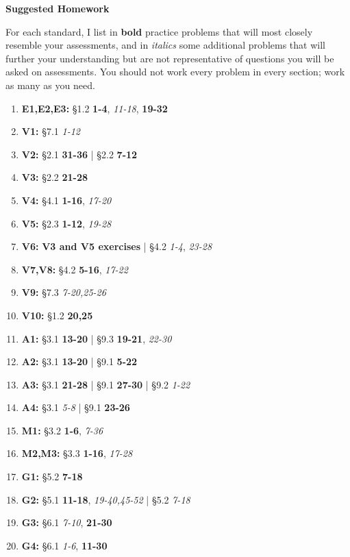 \documentclass{article}
\begin{document}
\begin{center}
\Large \textbf{Suggested Homework}
\end{center}

\newcommand{\closeExamples}{\textbf}
\newcommand{\otherExamples}{\textit}
\newcommand{\standards}[1]{\item[\textbf{#1}]}

For each standard, I list in \closeExamples{bold} practice problems that will most closely resemble your assessments, and in \otherExamples{italics} some additional problems that will further your understanding but are not representative of questions you will be asked on assessments.  You should not work every problem in every section; work as many as you need.

\begin{enumerate}
  \standards{E1,E2,E3:} \S 1.2
    \closeExamples{1-4},
    \otherExamples{11-18},
    \closeExamples{19-32}


  \standards{V1:} \S 7.1
    \otherExamples{1-12}

  \standards{V2:} \S 2.1
    \closeExamples{31-36}
    | \S 2.2
    \closeExamples{7-12}

  \standards{V3:} \S 2.2
    \closeExamples{21-28}

  \standards{V4:} \S 4.1
    \closeExamples{1-16},
    \otherExamples{17-20}

  \standards{V5:} \S 2.3
    \closeExamples{1-12},
    \otherExamples{19-28}

  \standards{V6:}
    \closeExamples{\textbf{V3} and \textbf{V5} exercises}
    | \S 4.2
    \otherExamples{1-4},
    \otherExamples{23-28}

  \standards{V7,V8:} \S 4.2
    \closeExamples{5-16},
    \otherExamples{17-22}

   \standards{V9:} \S 7.3 \otherExamples{7-20,25-26}

   \standards{V10:} \S 1.2 \closeExamples{20,25}

  \standards{A1:} \S 3.1 \closeExamples{13-20} | \S 9.3 \closeExamples{19-21}, \otherExamples{22-30}
  \standards{A2:} \S 3.1 \closeExamples{13-20} | \S 9.1 \closeExamples{5-22}
  \standards{A3:} \S 3.1 \closeExamples{21-28} | \S 9.1 \closeExamples{27-30} | \S 9.2 \otherExamples{1-22}
  \standards{A4:} \S 3.1 \otherExamples{5-8} | \S 9.1 \closeExamples{23-26}
  \standards{M1:} \S 3.2 \closeExamples{1-6}, \otherExamples{7-36}
  \standards{M2,M3:} \S 3.3 \closeExamples{1-16}, \otherExamples{17-28}
  \standards{G1:} \S 5.2 \closeExamples{7-18}
  \standards{G2:} \S 5.1 \closeExamples{11-18}, \otherExamples{19-40,45-52} | \S 5.2 \otherExamples{7-18}
  \standards{G3:} \S 6.1 \otherExamples{7-10}, \closeExamples{21-30}
  \standards{G4:} \S 6.1 \otherExamples{1-6}, \closeExamples{11-30}
\end{enumerate}
\end{document}
